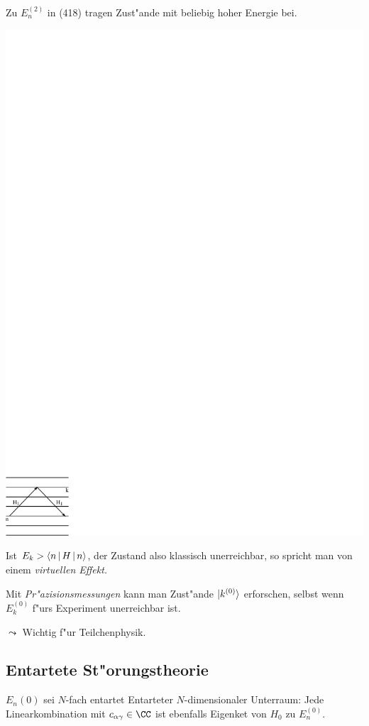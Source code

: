 \documentclass[a4paper]{scrartcl}
\begin{document}
Zu $E_n^{(2)}$ in (418) tragen Zust"ande mit beliebig hoher Energie bei.
\begin{center}
\includegraphics{419Ubergang}
\end{center}
Ist $E_k > \Braket{n | H | n}$, der Zustand also klassisch unerreichbar, so spricht man von einem \emph{virtuellen Effekt.}

Mit \emph{Pr"azisionsmessungen } kann man Zust"ande $\ket {k^{(0)}}$ erforschen, selbst wenn $E_k^{(0)}$ f"urs Experiment unerreichbar ist.

$\leadsto$ Wichtig f"ur Teilchenphysik.

\subsection{Entartete St"orungstheorie}

$E_n{(0)}$ sei $N$-fach entartet
Entarteter $N$-dimensionaler Unterraum:
Jede Linearkombination 
mit $c_{\alpha \gamma} \in \CC$ ist ebenfalls Eigenket von $H_0$ zu $E_n^{(0)}$.
\end{document}
